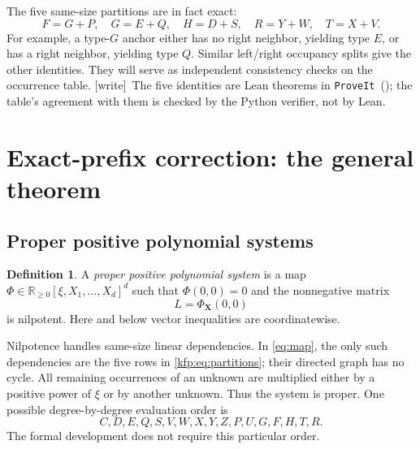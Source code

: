 \documentclass[11pt,a4paper]{article}
\theoremstyle{definition}
\newtheorem{definition}[theorem]{Definition}
\theoremstyle{remark}
\newcommand{\R}{\mathbb R}
\newcommand{\bX}{\boldsymbol X}
\newcommand{\repo}{\texttt{ProveIt}}
\newcommand{\wtag}{\textsf{\small[write]}}
\begin{document}
The five same-size partitions are in fact exact:
\begin{equation}\label{kfp:eq:partitions}
 F=G+P,\quad G=E+Q,\quad H=D+S,\quad R=Y+W,\quad T=X+V.
\end{equation}
For example, a type-$G$ anchor either has no right neighbor, yielding type
$E$, or has a right neighbor, yielding type $Q$. Similar left/right occupancy
splits give the other identities. They will serve as independent consistency
checks on the occurrence table.
\wtag\ The five identities are Lean theorems in \repo\
(); the table's agreement with them is
checked by the Python verifier, not by Lean.

\section{Exact-prefix correction: the general theorem}
\label{kfp:sec:prefix}

\subsection{Proper positive polynomial systems}
\begin{definition}
A \emph{proper positive polynomial system} is a map
$\Phi\in\R_{\geq0}[\xi,X_1,\ldots,X_d]^d$ such that
$\Phi(0,0)=0$ and the nonnegative matrix
\[
 L=\Phi_{\bX}(0,0)
\]
is nilpotent. Here and below vector inequalities are coordinatewise.
\end{definition}

Nilpotence handles same-size linear dependencies. In \eqref{eq:map}, the
only such dependencies are the five rows in \eqref{kfp:eq:partitions}; their
directed graph has no cycle. All remaining occurrences of an unknown are
multiplied either by a positive power of $\xi$ or by another unknown.
Thus the system is proper. One possible degree-by-degree evaluation order is
\[
 C,D,E,Q,S,V,W,X,Y,Z,P,U,G,F,H,T,R.
\]
The formal development does not require this particular order.
\end{document}
